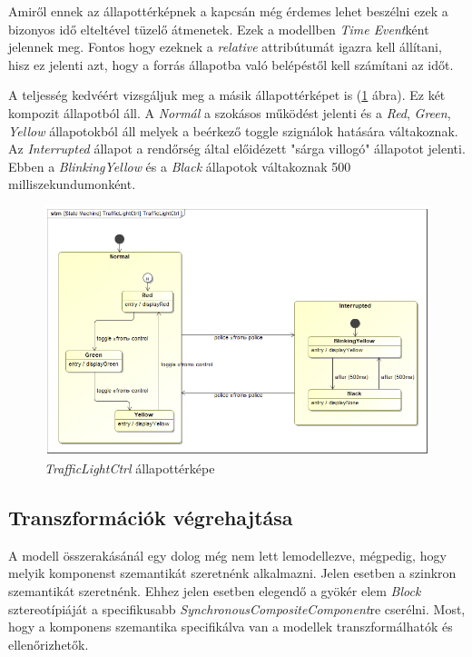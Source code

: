 Amiről ennek az állapottérképnek a kapcsán még érdemes lehet beszélni ezek a bizonyos idő elteltével tüzelő átmenetek. Ezek a modellben \emph{Time Event}ként jelennek meg. Fontos hogy ezeknek a \emph{relative} attribútumát igazra kell állítani, hisz ez jelenti azt, hogy a forrás állapotba való belépéstől kell számítani az időt.

A teljesség kedvéért vizsgáljuk meg a másik állapottérképet is (\ref{fig:LightCtrlSM} ábra). Ez két kompozit állapotból áll. A \emph{Normál} a szokásos működést jelenti és a \emph{Red}, \emph{Green}, \emph{Yellow} állapotokból áll melyek a beérkező toggle szignálok hatására váltakoznak.
Az \emph{Interrupted} állapot a rendőrség által előidézett "sárga villogó" állapotot jelenti. Ebben a \emph{BlinkingYellow} és a \emph{Black} állapotok váltakoznak 500 milliszekundumonként.  

\begin{figure}[!ht]
	\centering
	\includegraphics[width=12cm, keepaspectratio]{figures/contribution/TrafficLightCtrlSM.png}
	\caption{\emph{TrafficLightCtrl} állapottérképe}
	\label{fig:LightCtrlSM}
\end{figure}


\subsection{Transzformációk végrehajtása}

A modell összerakásánál egy dolog még nem lett lemodellezve, mégpedig, hogy melyik komponenst szemantikát szeretnénk alkalmazni. Jelen esetben a szinkron szemantikát szeretnénk. Ehhez jelen esetben elegendő a gyökér elem \emph{Block} sztereotípiáját a specifikusabb \emph{SynchronousCompositeComponent}re cserélni.
Most, hogy a komponens szemantika specifikálva van a modellek transzformálhatók és ellenőrizhetők.

